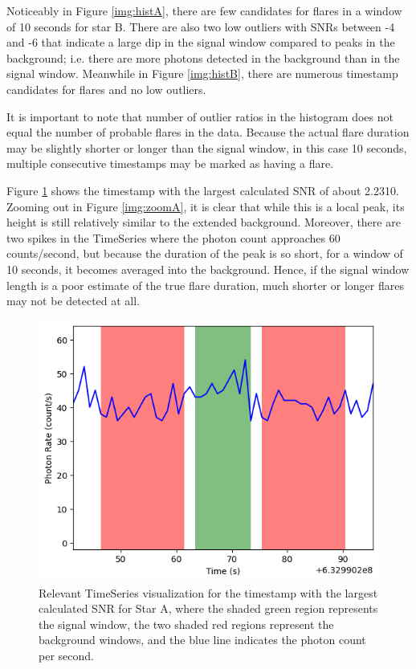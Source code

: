 \documentclass{article}
\begin{document}
\begin{multicols}{2}

Noticeably in Figure \ref{img:histA}, there are few candidates for flares in a window of 10 seconds for star B. There are also two low outliers with SNRs between -4 and -6 that indicate a large dip in the signal window compared to peaks in the background; i.e. there are more photons detected in the background than in the signal window. Meanwhile in Figure \ref{img:histB}, there are numerous timestamp candidates for flares and no low outliers. 

It is important to note that number of outlier ratios in the histogram does not equal the number of probable flares in the data. Because the actual flare duration may be slightly shorter or longer than the signal window, in this case 10 seconds, multiple consecutive timestamps may be marked as having a flare. 

Figure \ref{img:peakA} shows the timestamp with the largest calculated SNR of about 2.2310. Zooming out in Figure \ref{img:zoomA}, it is clear that while this is a local peak, its height is still relatively similar to the extended background. Moreover, there are two spikes in the TimeSeries where the photon count approaches 60 counts/second, but because the duration of the peak is so short, for a window of 10 seconds, it becomes averaged into the background. Hence, if the signal window length is a poor estimate of the true flare duration, much shorter or longer flares may not be detected at all. 

\end{multicols}

\newpage

\begin{figure}[t]
    \centering
    \includegraphics[scale=0.5]{333_ts_peak.png}
    \caption{Relevant TimeSeries visualization for the timestamp with the largest calculated SNR for Star A, where the shaded green region represents the signal window, the two shaded red regions represent the background windows, and the blue line indicates the photon count per second.}
    \label{img:peakA}
\end{figure}
\end{document}
